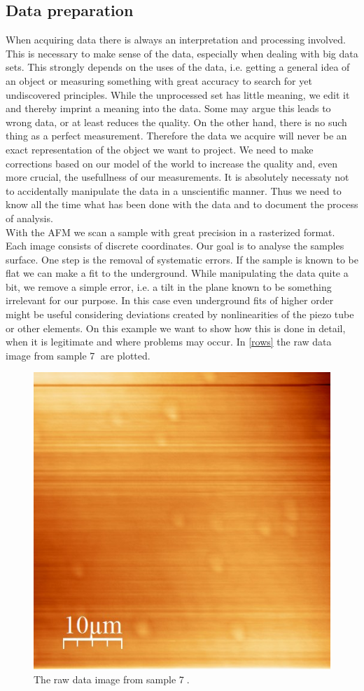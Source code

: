 \documentclass[paper=a4,fontsize=10pt,DIV=18,twocolumn,parskip=half]{scrartcl}
\numberwithin{equation}{section}    %
\begin{document}
\subsection{Data preparation}
When acquiring data there is always an interpretation and processing involved.  
This is necessary to make sense of the data, especially when dealing with big 
data sets. This strongly depends on the uses of the data, i.e. getting a general 
idea of an object or measuring something with great accuracy to search for yet 
undiscovered principles. While the unprocessed set has little meaning, we edit 
it and thereby imprint a meaning into the data. Some may argue this leads to 
wrong data, or at least reduces the quality. On the other hand, there is no such 
thing as a perfect measurement.  Therefore the data we acquire will never be an 
exact representation of the object we want to project. We need to make 
corrections based on our model of the world to increase the quality and, even 
more crucial, the usefullness of our measurements.  It is absolutely necessaty 
not to accidentally manipulate the data in a unscientific manner. Thus we need 
to know all the time what has been done with the data and to document the 
process of analysis. \\
With the AFM we scan a sample with great precision in a rasterized format. Each 
image consists of discrete coordinates. Our goal is to analyse the samples 
surface. One step is the removal of systematic errors. If the sample is known to 
be flat we can make a fit to the underground. While manipulating the data quite 
a bit, we remove a simple error, i.e. a tilt in the plane known to be something 
irrelevant for our purpose. In this case even underground fits of higher order 
might be useful considering deviations created by nonlinearities of the piezo 
tube or other elements. On this example we want to show how this is done in detail, when it is legitimate and where problems may occur. In \ref{rows} the raw data image from sample \textcircled{7} are plotted.

\begin{figure}[htp]
    \begin{center}
        \includegraphics[width=0.7\columnwidth]{Bilder/7}
        \caption{The raw data image from sample \textcircled{7}. }
        \label{7}
    \end{center}
\end{figure}
\end{document}
